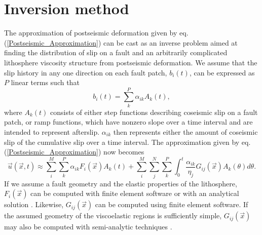 \documentclass[extra]{gji}
\begin{document}
\section{Inversion method}
The approximation of postseismic deformation given by eq.
(\ref{Postseismic_Approximation}) can be cast as an inverse problem
aimed at finding the distribution of slip on a fault and an
arbitrarily complicated lithosphere viscosity structure from
postseismic deformation. We assume that the slip history in any one
direction on each fault patch, $b_i(t)$, can be expressed as $P$ linear
terms such that
\begin{equation}
  b_i(t) = \sum_k^P \alpha_{ik}A_k(t),
\end{equation}
where $A_k(t)$ consists of either step functions describing coseismic
slip on a fault patch, or ramp functions, which have nonzero slope
over a time interval and are intended to represent afterslip.
$\alpha_{ik}$ then represents either the amount of coseismic slip of
the cumulative slip over a time interval.  The approximation given by
eq. (\ref{Postseismic_Approximation}) now becomes
\begin{equation}\label{Postseismic_Approximation2}
  \vec{u}(\vec{x},t) \approx
  \sum_i^M\sum_k^P\alpha_{ik}F_i(\vec{x})A_k(t) +
  \sum_i^M\sum_j^N\sum_k^P\int_0^t\frac{\alpha_{ik}}{\eta_j}G_{ij}(\vec{x})A_k(\theta)d\theta.
\end{equation}
If we assume a fault geometry and the elastic properties of the
lithosphere, $F_i(\vec{x})$ can be computed with finite element
software or with an analytical solution
\citep[e.g.][]{O1992,M2007}. Likewise, $G_{ij}(\vec{x})$ can be
computed using finite element software.  If the assumed geometry of
the viscoelastic regions is sufficiently simple, $G_{ij}(\vec{x})$ may
also be computed with semi-analytic techniques
\citep[e.g.][]{P1997,FM2006,BF2010}.
\end{document}
